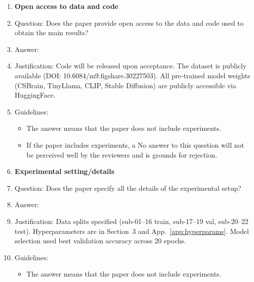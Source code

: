 \documentclass{article}
\begin{document}
\begin{enumerate}
\item {\bf Open access to data and code}
    \item[] Question: Does the paper provide open access to the data and code used to obtain the main results?
    \item[] Answer: \answerNo{}
    \item[] Justification: Code will be released upon acceptance. The dataset is publicly available (DOI: 10.6084/m9.figshare.30227503). All pre-trained model weights (CSBrain, TinyLlama, CLIP, Stable Diffusion) are publicly accessible via HuggingFace.
    \item[] Guidelines:
    \begin{itemize}
        \item The answer \answerNA{} means that the paper does not include experiments.
        \item If the paper includes experiments, a No answer to this question will not be perceived well by the reviewers and is grounds for rejection.
    \end{itemize}

\item {\bf Experimental setting/details}
    \item[] Question: Does the paper specify all the details of the experimental setup?
    \item[] Answer: \answerYes{}
    \item[] Justification: Data splits specified (sub-01--16 train, sub-17--19 val, sub-20--22 test). Hyperparameters are in Section~3 and App.~\ref{app:hyperparams}. Model selection used best validation accuracy across 20 epochs.
    \item[] Guidelines:
    \begin{itemize}
        \item The answer \answerNA{} means that the paper does not include experiments.
    \end{itemize}


\end{enumerate}
\end{document}
